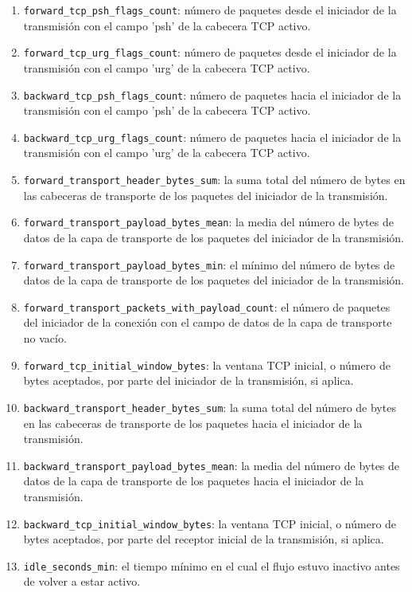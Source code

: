 \begin{enumerate}
  \item \texttt{forward\_tcp\_psh\_flags\_count}: número de paquetes desde el iniciador de la transmisión con el campo 'psh' de la cabecera TCP activo.
  \item \texttt{forward\_tcp\_urg\_flags\_count}: número de paquetes desde el iniciador de la transmisión con el campo 'urg' de la cabecera TCP activo.
  \item \texttt{backward\_tcp\_psh\_flags\_count}: número de paquetes hacia el iniciador de la transmisión con el campo 'psh' de la cabecera TCP activo.
  \item \texttt{backward\_tcp\_urg\_flags\_count}: número de paquetes hacia el iniciador de la transmisión con el campo 'urg' de la cabecera TCP activo.
  \item \texttt{forward\_transport\_header\_bytes\_sum}: la suma total del número de bytes en las cabeceras de transporte de los paquetes del iniciador de la transmisión.
  \item \texttt{forward\_transport\_payload\_bytes\_mean}: la media del número de bytes de datos de la capa de transporte de los paquetes del iniciador de la transmisión.
  \item \texttt{forward\_transport\_payload\_bytes\_min}: el mínimo del número de bytes de datos de la capa de transporte de los paquetes del iniciador de la transmisión.
  \item \texttt{forward\_transport\_packets\_with\_payload\_count}: el número de paquetes del iniciador de la conexión con el campo de datos de la capa de transporte no vacío.
  \item \texttt{forward\_tcp\_initial\_window\_bytes}: la ventana TCP inicial, o número de bytes aceptados, por parte del iniciador de la transmisión, si aplica.
  \item \texttt{backward\_transport\_header\_bytes\_sum}: la suma total del número de bytes en las cabeceras de transporte de los paquetes hacia el iniciador de la transmisión.
  \item \texttt{backward\_transport\_payload\_bytes\_mean}: la media del número de bytes de datos de la capa de transporte de los paquetes hacia el iniciador de la transmisión.
  \item \texttt{backward\_tcp\_initial\_window\_bytes}: la ventana TCP inicial, o número de bytes aceptados, por parte del receptor inicial de la transmisión, si aplica.
  \item \texttt{idle\_seconds\_min}: el tiempo mínimo en el cual el flujo estuvo inactivo antes de volver a estar activo.

\end{enumerate}
